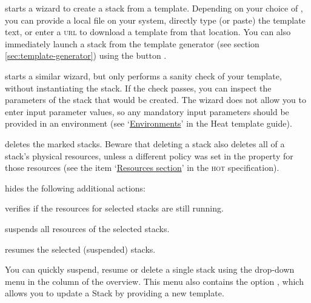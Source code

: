 \begin{description}
\item{} starts a wizard to create a stack from a
  template.  Depending on your choice of , you
  can provide a local file on your system, directly type (or paste)
  the template text, or enter a \textsc{url} to download a template
  from that location.  You can also immediately launch a stack from
  the template generator (see section \ref{sec:template-generator})
  using the button .
\item{} starts a similar wizard, but only
  performs a sanity check of your template, without instantiating the
  stack.  If the check passes, you can inspect the parameters of the
  stack that would be created.  The wizard does not allow you to enter
  input parameter values, so any mandatory input parameters should be
  provided in an environment (see
  `\href{https://docs.openstack.org/heat/latest/template_guide/environment.html}{Environments}'
  in the Heat template guide).
\item{} deletes the marked stacks.  Beware that
  deleting a stack also deletes all of a stack's physical resources,
  unless a different policy was set in the
   property for those resources
  (see the item
  `\href{https://docs.openstack.org/heat/rocky/template_guide/hot_spec.html#resources-section}{Resources
    section}' in the \textsc{hot} specification).
\item{} hides the following additional actions:
  \begin{description}
  \item{} verifies if the resources for selected
    stacks are still running.
  \item{} suspends all resources of the
    selected stacks.
  \item{} resumes the selected (suspended) stacks.
  \end{description}
\end{description}
You can quickly suspend, resume or delete a single stack using the
drop-down menu in the  column of the overview.  This
menu also contains the option , which
allows you to update a Stack by providing a new template.

